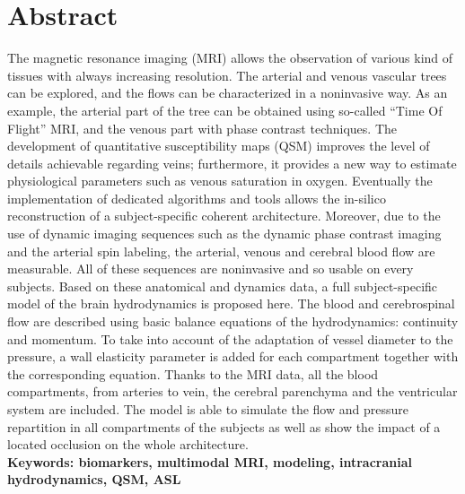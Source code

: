 \section*{Abstract}
The magnetic resonance imaging (MRI) allows the observation of various kind of tissues with
always increasing resolution. The arterial and venous vascular trees can be explored, and the flows can
be characterized in a noninvasive way. As an example, the arterial part of the tree can be obtained
using so-called “Time Of Flight” MRI, and the venous part with phase contrast techniques. The
development of quantitative susceptibility maps (QSM) improves the level of details achievable
regarding veins; furthermore, it provides a new way to estimate physiological parameters such as
venous saturation in oxygen. Eventually the implementation of dedicated algorithms and tools allows
the in-silico reconstruction of a subject-specific coherent architecture. Moreover, due to the use of
dynamic imaging sequences such as the dynamic phase contrast imaging and the arterial spin labeling,
the arterial, venous and cerebral blood flow are measurable. All of these sequences are noninvasive
and so usable on every subjects. Based on these anatomical and dynamics data, a full subject-specific
model of the brain hydrodynamics is proposed here. The blood and cerebrospinal flow are described
using basic balance equations of the hydrodynamics: continuity and momentum. To take into account
of the adaptation of vessel diameter to the pressure, a wall elasticity parameter is added for each
compartment together with the corresponding equation. Thanks to the MRI data, all the blood
compartments, from arteries to vein, the cerebral parenchyma and the ventricular system are
included. The model is able to simulate the flow and pressure repartition in all compartments of the
subjects as well as show the impact of a located occlusion on the whole architecture.\\
{\bf Keywords: biomarkers, multimodal MRI, modeling, intracranial hydrodynamics, QSM, ASL}

